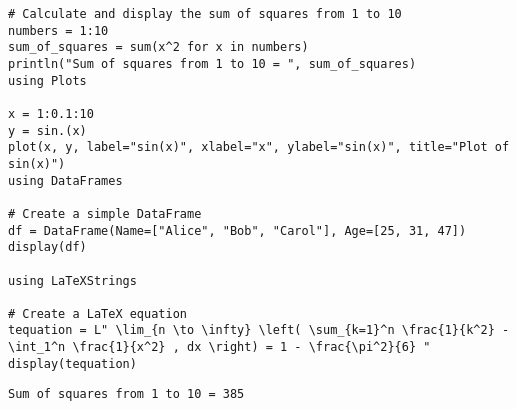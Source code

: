 \newpage

\bigskip
\begin{lstlisting}[language=JuliaLocal, style=julia, texcl=true]
# Calculate and display the sum of squares from 1 to 10
numbers = 1:10
sum_of_squares = sum(x^2 for x in numbers)
println("Sum of squares from 1 to 10 = ", sum_of_squares)
using Plots

x = 1:0.1:10
y = sin.(x)
plot(x, y, label="sin(x)", xlabel="x", ylabel="sin(x)", title="Plot of sin(x)")
using DataFrames

# Create a simple DataFrame
df = DataFrame(Name=["Alice", "Bob", "Carol"], Age=[25, 31, 47])
display(df)

using LaTeXStrings

# Create a LaTeX equation
tequation = L" \lim_{n \to \infty} \left( \sum_{k=1}^n \frac{1}{k^2} - \int_1^n \frac{1}{x^2} , dx \right) = 1 - \frac{\pi^2}{6} "
display(tequation)
\end{lstlisting}

\begingroup

\fontsize{10pt}{12pt}\selectfont

\begin{verbatim}
Sum of squares from 1 to 10 = 385

\end{verbatim}

\endgroup
